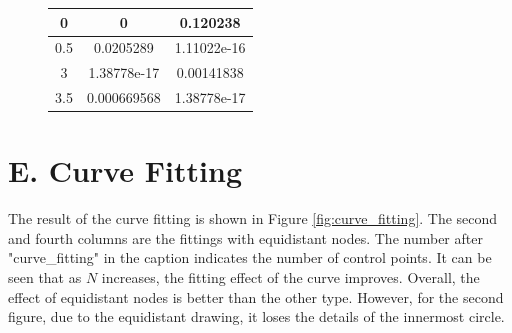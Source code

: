 \documentclass[a4paper]{article}
\begin{document}
\begin{figure}[h]
\begin{minipage}{0.35\textwidth}
\begin{tabular}{|c|c|c|}
       0         & 0                              & 0.120238                         \\ \hline
       0.5       & 0.0205289                      & 1.11022e-16                      \\ \hline
       3         & 1.38778e-17                    & 0.00141838                       \\ \hline
       3.5       & 0.000669568                    & 1.38778e-17                      \\ \hline
    \end{tabular}
    \label{tab:interpolation_errors}
  \end{minipage}
\end{figure}

\newpage

\section*{E. Curve Fitting}

The result of the curve fitting is shown in Figure \ref{fig:curve_fitting}. The second and fourth columns are the fittings with equidistant nodes. The number after "curve\_fitting" in the caption indicates the number of control points. It can be seen that as $N$ increases, the fitting effect of the curve improves. Overall, the effect of equidistant nodes is better than the other type. However, for the second figure, due to the equidistant drawing, it loses the details of the innermost circle.
\end{document}
